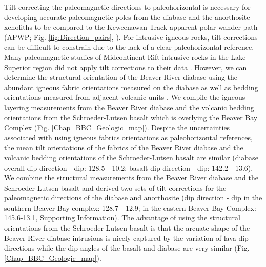 Tilt-correcting the paleomagnetic directions to paleohorizontal is necessary for developing accurate paleomagnetic poles from the diabase and the anorthosite xenoliths to be compared to the Keweenawan Track apparent polar wander path (APWP; Fig. \ref{fig:Direction_pairs}, \cite{Swanson-Hysell2019a}). For intrusive igneous rocks, tilt corrections can be difficult to constrain due to the lack of a clear paleohorizontal reference. Many paleomagnetic studies of Midcontinent Rift intrusive rocks in the Lake Superior region did not apply tilt corrections to their data \cite[e.g.][]{Beck1969a, Beck1970a, Books1966a}. However, we can determine the structural orientation of the Beaver River diabase using the abundant igneous fabric orientations measured on the diabase as well as bedding orientations measured from adjacent volcanic units \citep{Boerboom2004a, Boerboom2006a, Boerboom2006b, Boerboom2007a, Miller2001a}. We compile the igneous layering measurements from the Beaver River diabase and the volcanic bedding orientations from the Schroeder-Lutsen basalt which is overlying the Beaver Bay Complex (Fig. \ref{Chap_BBC_Geologic_map}). Despite the uncertainties associated with using igneous fabrics orientations as paleohorizontal references, the mean tilt orientations of the fabrics of the Beaver River diabase and the volcanic bedding orientations of the Schroeder-Lutsen basalt are similar (diabase overall dip direction - dip: 128.5 - 10.2; basalt dip direction - dip: 142.2 - 13.6). We combine the structural measurements from the Beaver River diabase and the Schroeder-Lutsen basalt and derived two sets of tilt corrections for the paleomagnetic directions of the diabase and anorthosite (dip direction - dip in the southern Beaver Bay complex: 128.7 - 12.9; in the eastern Beaver Bay Complex: 145.6-13.1, Supporting Information). The advantage of using the structural orientations from the Schroeder-Lutsen basalt is that the arcuate shape of the Beaver River diabase intrusions is nicely captured by the variation of lava dip directions while the dip angles of the basalt and diabase are very similar (Fig. \ref{Chap_BBC_Geologic_map}).

